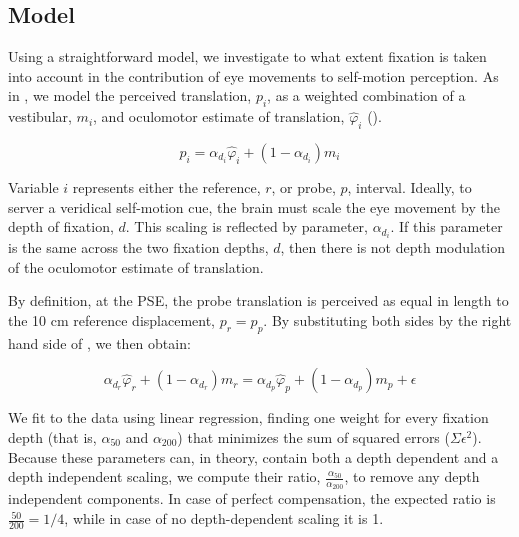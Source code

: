 \subsection{Model}

Using a straightforward model, we investigate to what extent fixation is taken into account in the contribution of eye movements to self-motion perception. As in , we model the perceived translation, $p_i$, as a weighted combination of a vestibular, $m_i$, and oculomotor estimate of translation, $\hat{\varphi}_i$ (). 

\begin{equation}
\label{p4:eq4}
p_i = \alpha_{d_i} \hat{\varphi}_i + (1 - \alpha_{d_i}) m_i
\end{equation}

Variable $i$ represents either the reference, $r$, or probe, $p$, interval. Ideally, to server a veridical self-motion cue, the brain must scale the eye movement by the depth of fixation, $d$. This scaling is reflected by parameter, $\alpha_{d_i}$. If this parameter is the same across the two fixation depths, $d$, then there is not depth modulation of the oculomotor estimate of translation.

By definition, at the PSE, the probe translation is perceived as equal in length to the 10 cm reference displacement, $p_r = p_p$. By substituting both sides by the right hand side of , we then obtain:

\begin{equation}
\label{p4:eq5}
\alpha_{d_r} \hat{\varphi}_r + (1 - \alpha_{d_r}) m_r = \alpha_{d_p} \hat{\varphi}_p + (1 - \alpha_{d_p}) m_p + \epsilon
\end{equation}

We fit  to the data using linear regression, finding one weight for every fixation depth (that is, $\alpha_{50}$ and $\alpha_{200}$) that minimizes the sum of squared errors ($\Sigma \epsilon^2$). Because these parameters can, in theory, contain both a depth dependent and a depth independent scaling, we compute their ratio, $\frac{\alpha_{50}}{\alpha_{200}}$, to remove any depth independent components. In case of perfect compensation, the expected ratio is $\frac{50}{200} = 1/4$, while in case of no depth-dependent scaling it is 1.


